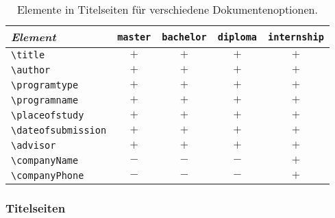 \begin{table}
    \caption{Elemente in Titelseiten für verschiedene Dokumentenoptionen.}
    \label{tab:TitelElemente}
    \centering\small
    \begin{tabular}{@{}lcccc@{}}
        \toprule
        \emph{Element} & \texttt{master} & \texttt{bachelor} & 
				\texttt{diploma} & \texttt{internship} \\
        \midrule
        \verb!\title!            & $+$ & $+$ & $+$ & $+$ \\
        \verb!\author!           & $+$ & $+$ & $+$ & $+$ \\
        \verb!\programtype!      & $+$ & $+$ & $+$ & $+$ \\
        \verb!\programname!      & $+$ & $+$ & $+$ & $+$ \\
        \verb!\placeofstudy!     & $+$ & $+$ & $+$ & $+$ \\
        \verb!\dateofsubmission! & $+$ & $+$ & $+$ & $+$ \\
        \verb!\advisor!          & $+$ & $+$ & $+$ & $+$ \\
        \verb!\companyName!      & $-$ & $-$ & $-$ & $+$ \\
        \verb!\companyPhone!     & $-$ & $-$ & $-$ & $+$ \\
        \bottomrule
    \end{tabular}
\end{table}

\subsubsection{Titelseiten}


